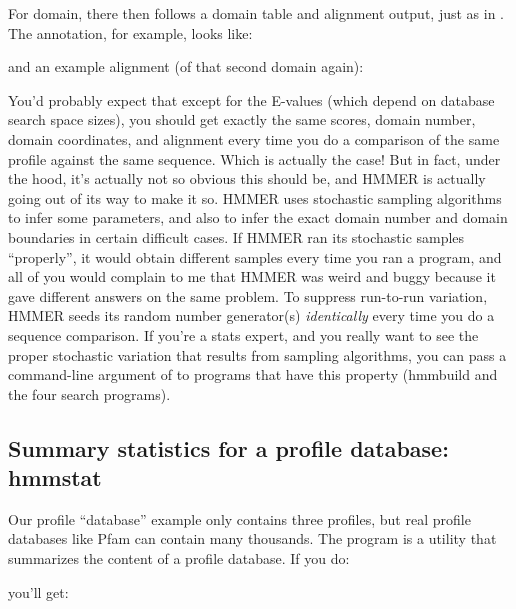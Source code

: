 For domain, there then follows a domain table and alignment output,
just as in . The  annotation, for example,
looks like:


and an example alignment (of that second domain again):


You'd probably expect that except for the E-values (which depend on
database search space sizes), you should get exactly the same scores,
domain number, domain coordinates, and alignment every time you do a
comparison of the same profile against the same sequence. Which is
actually the case! But in fact, under the hood, it's actually not so
obvious this should be, and HMMER is actually going out of its way to
make it so. HMMER uses stochastic sampling algorithms to infer some
parameters, and also to infer the exact domain number and domain
boundaries in certain difficult cases. If HMMER ran its stochastic
samples ``properly'', it would obtain different samples every time you
ran a program, and all of you would complain to me that HMMER was
weird and buggy because it gave different answers on the same
problem. To suppress run-to-run variation, HMMER seeds its random
number generator(s) \emph{identically} every time you do a sequence
comparison. If you're a stats expert, and you really want to see the
proper stochastic variation that results from sampling algorithms, you
can pass a command-line argument of  to programs that
have this property (hmmbuild and the four search programs).



\subsection{Summary statistics for a profile database: hmmstat}

Our  profile ``database'' example only contains three
profiles, but real profile databases like Pfam can contain many
thousands. The  program is a utility that summarizes the
content of a profile database. If you do:

   \vspace{1ex}
   \vspace{1ex}

you'll get:
   
   
